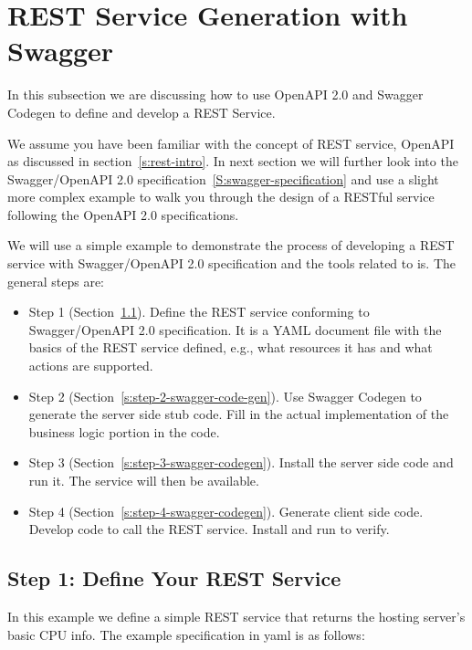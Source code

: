 
\section{REST Service Generation with Swagger}
\label{c:swagger-codegen}


In this subsection we are discussing how to use OpenAPI 2.0 and Swagger
Codegen to define and develop a REST Service.

We assume you have been familiar with the concept of REST service,
OpenAPI as discussed in section~\ref{s:rest-intro}.
In next section we will further look into the
Swagger/OpenAPI 2.0 specification~\ref{S:swagger-specification} and
use a slight more complex example to walk you through the design of
a RESTful service following the OpenAPI 2.0 specifications.

We will use a simple example to demonstrate the process of developing a
REST service with Swagger/OpenAPI 2.0 specification and the tools
related to is. The general steps are:

\begin{itemize}
\item Step 1 (Section~\ref{s:step-1-define-your-rest-service}). Define
  the REST service conforming to Swagger/OpenAPI 2.0 specification. It
  is a YAML document file with the basics of the REST service defined,
  e.g., what resources it has and what actions are supported.
\item Step 2 (Section~\ref{s:step-2-swagger-code-gen}). Use Swagger
  Codegen to generate the server side stub code.  Fill in the actual
  implementation of the business logic portion in the code.
\item Step 3 (Section~\ref{s:step-3-swagger-codegen}). Install the
  server side code and run it. The service will then be available.
\item Step 4 (Section~\ref{s:step-4-swagger-codegen}). Generate client
  side code. Develop code to call the REST service. Install and run to
  verify.
\end{itemize}

\subsection{Step 1: Define Your REST  Service}
\label{s:step-1-define-your-rest-service}

In this example we define a simple REST service that returns the hosting
server's basic CPU info. The example specification in yaml is as
follows:

